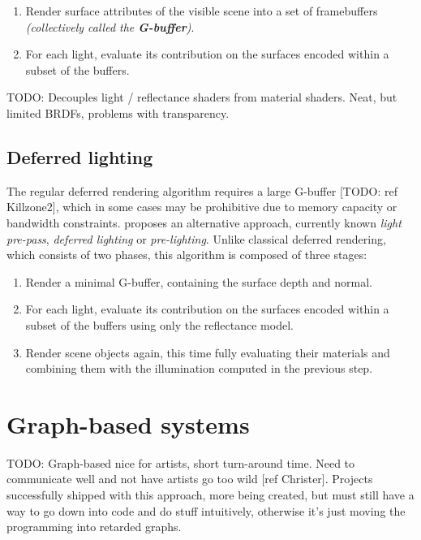 \begin{enumerate}
\item Render surface attributes of the visible scene into a set of framebuffers \emph{(collectively called the \textbf{G-buffer})}.
\item For each light, evaluate its contribution on the surfaces encoded within a subset of the buffers.
\end{enumerate}

TODO: Decouples light / reflectance shaders from material shaders. Neat, but limited BRDFs, problems with transparency.

\subsection{Deferred lighting}

The regular deferred rendering algorithm requires a large G-buffer [TODO: ref Killzone2], which in some cases may be prohibitive due to memory capacity or bandwidth constraints. \citet{Engel08PrePass} proposes an alternative approach, currently known \emph{light pre-pass}, \emph{deferred lighting} or \emph{pre-lighting}. Unlike classical deferred rendering, which consists of two phases, this algorithm is composed of three stages:

\begin{enumerate}
\item Render a minimal G-buffer, containing the surface depth and normal.
\item For each light, evaluate its contribution on the surfaces encoded within a subset of the buffers using only the reflectance model.
\item Render scene objects again, this time fully evaluating their materials and combining them with the illumination computed in the previous step.
\end{enumerate}


\section{Graph-based systems}

TODO: Graph-based nice for artists, short turn-around time. Need to communicate well and not have artists go too wild [ref Christer]. Projects successfully shipped with this approach, more being created, but must still have a way to go down into code and do stuff intuitively, otherwise it's just moving the programming into retarded graphs.

